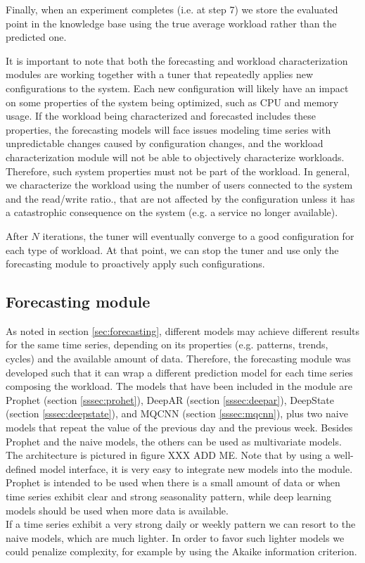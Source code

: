 \documentclass[a4paper]{article} %
\begin{document}
	Finally, when an experiment completes (i.e. at step 7) we store the evaluated point in the knowledge base using the true average workload rather than the predicted one.
	
	It is important to note that both the forecasting and workload characterization modules are working together with a tuner that repeatedly applies new configurations to the system. Each new configuration will likely have an impact on some properties of the system being optimized, such as CPU and memory usage. If the workload being characterized and forecasted includes these properties, the forecasting models will face issues modeling time series with unpredictable changes caused by configuration changes, and the workload characterization module will not be able to objectively characterize workloads. Therefore, such system properties must not be part of the workload. In general, we characterize the workload using the number of users connected to the system and the read/write ratio., that are not affected by the configuration unless it has a catastrophic consequence on the system (e.g. a service no longer available).
	
	After $N$ iterations, the tuner will eventually converge to a good configuration for each type of workload. At that point, we can stop the tuner and use only the forecasting module to proactively apply such configurations.

	\subsection{Forecasting module} \label{ssec:forecasting_module}
	As noted in section \ref{sec:forecasting}, different models may achieve different results for the same time series, depending on its properties (e.g. patterns, trends, cycles) and the available amount of data. Therefore, the forecasting module was developed such that it can wrap a different prediction model for each time series composing the workload.
	The models that have been included in the module are Prophet (section \ref{sssec:prohet}), DeepAR (section \ref{sssec:deepar}), DeepState (section \ref{sssec:deepstate}), and MQCNN (section \ref{sssec:mqcnn}), plus two naive models that repeat the value of the previous day and the previous week. Besides Prophet and the naive models, the others can be used as multivariate models. The architecture is pictured in figure XXX ADD ME. Note that by using a well-defined model interface, it is very easy to integrate new models into the module.\\
	Prophet is intended to be used when there is a small amount of data or when time series exhibit clear and strong seasonality pattern, while deep learning models should be used when more data is available.\\
	If a time series exhibit a very strong daily or weekly pattern we can resort to the naive models, which are much lighter. In order to favor such lighter models we could penalize complexity, for example by using the Akaike information criterion. 
	
\end{document}
